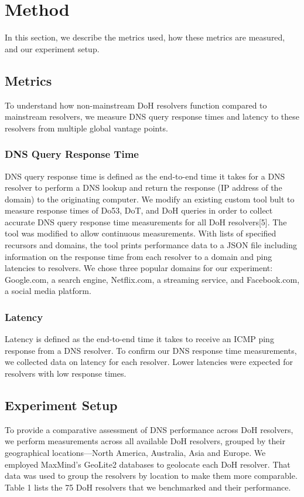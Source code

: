 \section{Method}\label{sec:method}

In this section, we describe the metrics used, how these metrics are measured, and our experiment setup.


\subsection{Metrics}
To understand how non-mainstream DoH resolvers function compared to mainstream resolvers, we measure DNS query response times and latency to these resolvers from multiple global vantage points.

\subsubsection{DNS Query Response Time}
DNS query response time is defined as the end-to-end time it takes for a DNS resolver to perform a DNS lookup and return the response (IP address of the domain) to the originating computer.
We modify an existing custom tool bult to measure response times of Do53, DoT, and DoH queries in order to collect accurate DNS query response time measurements for all DoH resolvers[5].
The tool was modified to allow continuous measurements.
With lists of specified recursors and domains, the tool prints performance data to a JSON file including information on the response time from each resolver to a domain and ping latencies to resolvers.
We chose three popular domains for our experiment: Google.com, a search engine, Netflix.com, a streaming service, and Facebook.com, a social media platform. 

\subsubsection{Latency}
Latency is defined as the end-to-end time it takes to receive an ICMP ping response from a DNS resolver.
To confirm our DNS response time measurements, we collected data on latency for each resolver. 
Lower latencies were expected for resolvers with low response times. 

\subsection{Experiment Setup}
To provide a comparative assessment of DNS performance across DoH resolvers, we perform measurements across all available DoH resolvers, grouped by their geographical locations—North America, Australia, Asia and Europe.
We employed MaxMind's GeoLite2 databases to geolocate each DoH resolver.
That data was used to group the resolvers by location to make them more comparable. 
Table 1 lists the 75 DoH resolvers that we benchmarked and their performance. 

